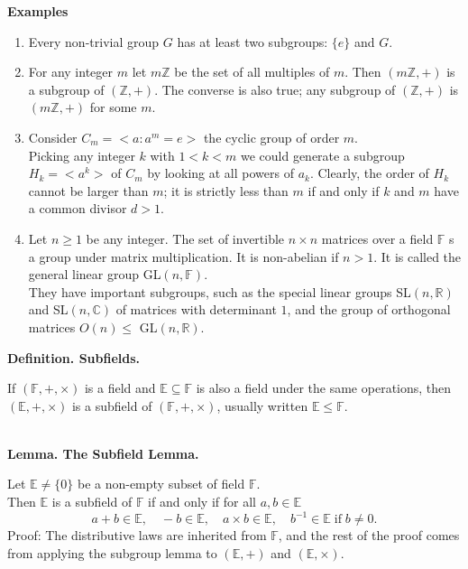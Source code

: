\documentclass{article}
\newcommand{\definition}[2]{\textbf{Definition. #1.}\begin{adjustwidth}{1cm}{1cm}#2\end{adjustwidth}}
\newcommand{\lemma}[2]{\textbf{Lemma. #1.}\begin{adjustwidth}{1cm}{1cm}#2\end{adjustwidth}}
\begin{document}
\textbf{Examples}\begin{enumerate}
  \item Every non-trivial group $G$ has at least two subgroups: $\{e\}$ and $G$.
  \item For any integer $m$ let $m\mathbb{Z}$ be the set of all multiples of $m$. Then $(m\mathbb{Z}, +)$ is a subgroup of $(\mathbb{Z}, +)$. The converse is also true; any subgroup of $(\mathbb{Z}, +)$ is $(m\mathbb{Z}, +)$ for some $m$.
  \item Consider $C_m = <a : a^m = e>$ the cyclic group of order $m$.\\Picking any integer $k$ with $1 < k < m$ we could generate a subgroup $H_k = <a^k>$ of $C_m$ by looking at all powers of $a_k$. Clearly, the order of $H_k$ cannot be larger than $m$; it is strictly less than $m$ if and only if $k$ and $m$ have a common divisor $d > 1$.
  \item Let $n \geq 1$ be any integer. The set of invertible $n \times n$ matrices over a field $\mathbb{F}$ s a group under matrix multiplication. It is non-abelian if $n > 1$. It is called the general linear group GL$(n, \mathbb{F})$.\\They have important subgroups, such as the special linear groups SL$(n,\mathbb{R})$ and SL$(n, \mathbb{C})$ of matrices with determinant $1$, and the group of orthogonal matrices $O(n) \leq$ GL$(n, \mathbb{R})$.
\end{enumerate}\newpage
\definition{Subfields}{If $(\mathbb{F}, +, \times)$ is a field and $\mathbb{E} \subseteq \mathbb{F}$ is also a field under the same operations, then $(\mathbb{E}, +, \times)$ is a subfield of $(\mathbb{F}, +, \times)$, usually written $\mathbb{E} \leq \mathbb{F}$.}~\\
\lemma{The Subfield Lemma}{Let $\mathbb{E} \neq \{0\}$ be a non-empty subset of field $\mathbb{F}$.\\Then $\mathbb{E}$ is a subfield of $\mathbb{F}$ if and only if for all $a,b \in \mathbb{E}$ \[a + b \in \mathbb{E}, \quad -b \in \mathbb{E}, \quad a \times b \in \mathbb{E}, \quad b^{-1} \in \mathbb{E} \; \text{if} \; b \neq 0.\]Proof: The distributive laws are inherited from $\mathbb{F}$, and the rest of the proof comes from applying the subgroup lemma to $(\mathbb{E}, +)$ and $(\mathbb{E}, \times)$.}~\\
\end{document}
